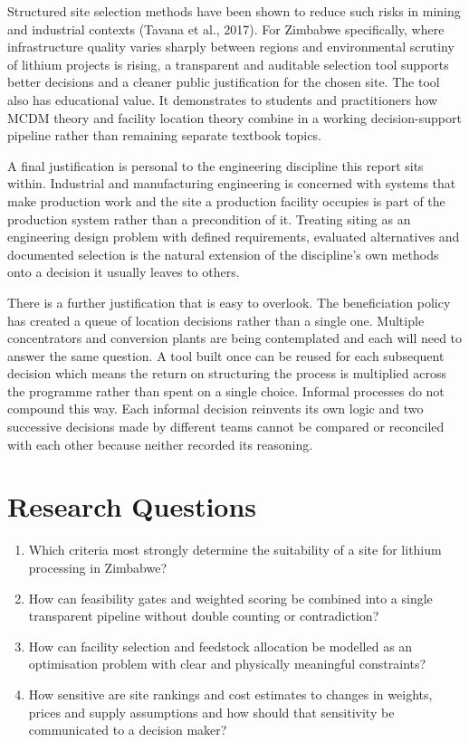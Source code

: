 \documentclass[12pt,a4paper]{report}
\begin{document}
Structured site selection methods have been shown to reduce such risks
in mining and industrial contexts (Tavana et al., 2017). For Zimbabwe
specifically, where infrastructure quality varies sharply between
regions and environmental scrutiny of lithium projects is rising, a
transparent and auditable selection tool supports better decisions and
a cleaner public justification for the chosen site. The tool also has
educational value. It demonstrates to students and practitioners how
MCDM theory and facility location theory combine in a working
decision-support pipeline rather than remaining separate textbook
topics.

A final justification is personal to the engineering discipline this
report sits within. Industrial and manufacturing engineering is
concerned with systems that make production work and the site a
production facility occupies is part of the production system rather
than a precondition of it. Treating siting as an engineering design
problem with defined requirements, evaluated alternatives and
documented selection is the natural extension of the discipline's own
methods onto a decision it usually leaves to others.

There is a further justification that is easy to overlook. The
beneficiation policy has created a queue of location decisions rather
than a single one. Multiple concentrators and conversion plants are
being contemplated and each will need to answer the same question.
A tool built once can be reused for each subsequent decision which
means the return on structuring the process is multiplied across the
programme rather than spent on a single choice. Informal processes do
not compound this way. Each informal decision reinvents its own logic
and two successive decisions made by different teams cannot be
compared or reconciled with each other because neither recorded its
reasoning.

\section{Research Questions}
\begin{enumerate}[leftmargin=1.5em]
  \item Which criteria most strongly determine the suitability of a
    site for lithium processing in Zimbabwe?
  \item How can feasibility gates and weighted scoring be combined into
    a single transparent pipeline without double counting or
    contradiction?
  \item How can facility selection and feedstock allocation be modelled
    as an optimisation problem with clear and physically meaningful
    constraints?
  \item How sensitive are site rankings and cost estimates to changes
    in weights, prices and supply assumptions and how should that
    sensitivity be communicated to a decision maker?
\end{enumerate}
\end{document}
